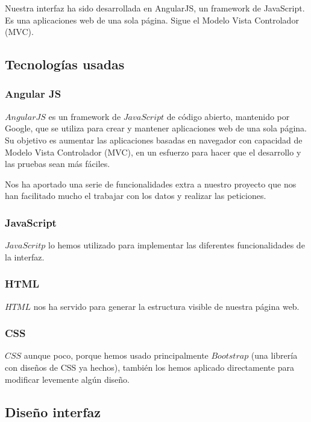 \documentclass[12pt,a4paper]{article}
\begin{document}
Nuestra interfaz ha sido desarrollada en AngularJS, un framework de JavaScript. Es una aplicaciones web de una sola página. Sigue el Modelo Vista Controlador (MVC).

\subsection{Tecnologías usadas} \label{pto71}
	\subsubsection{Angular JS} \label{pto711}
	
	$AngularJS$ es un framework de $JavaScript$ de código abierto, mantenido por Google, que se utiliza para crear y mantener aplicaciones web de una sola página. Su objetivo es aumentar las aplicaciones basadas en navegador con capacidad de Modelo Vista Controlador (MVC), en un esfuerzo para hacer que el desarrollo y las pruebas sean más fáciles.
	
Nos ha aportado una serie de funcionalidades extra a nuestro proyecto que nos han facilitado mucho el trabajar con los datos y realizar las peticiones.
	\subsubsection{JavaScript} \label{pto712}
	
	$JavaScritp$ lo hemos utilizado para implementar las diferentes funcionalidades de la interfaz.
	
	\subsubsection{HTML} \label{pto713}
	
$HTML$ nos ha servido para generar la estructura visible de nuestra página web.

	\subsubsection{CSS} \label{pto714}
	
	$CSS$ aunque poco, porque hemos usado principalmente $Bootstrap$ (una librería con diseños de CSS ya hechos),  también los hemos aplicado directamente para modificar levemente algún diseño.
	

\newpage


\subsection{Diseño interfaz} \label{pto72}
\end{document}
